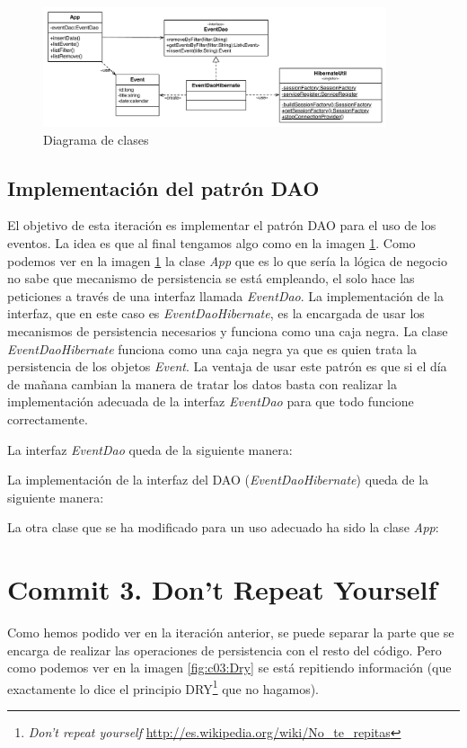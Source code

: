\documentclass{article}
\begin{document}
\begin{figure}[h]
  \centering
    \includegraphics[width=0.9\textwidth]{commit02/img/UmlClass.pdf}
  \caption{Diagrama de clases}
  \label{fig:c02:UmlClass}
\end{figure}	

\subsection{Implementación del patrón DAO}
	El objetivo de esta iteración es implementar el patrón DAO para el uso de los eventos. La idea es que al final tengamos algo como en la imagen \ref{fig:c02:UmlClass}. Como podemos ver en la imagen \ref{fig:c02:UmlClass} la clase \emph{App} que es lo que sería la lógica de negocio no sabe que mecanismo de persistencia se está empleando, el solo hace las peticiones a través de una interfaz llamada \emph{EventDao}. La implementación de la interfaz, que en este caso es \emph{EventDaoHibernate}, es la encargada de usar los mecanismos de persistencia necesarios y funciona como una caja negra. La clase \emph{EventDaoHibernate} funciona como una caja negra ya que es quien trata la persistencia de los objetos \emph{Event}. La ventaja de usar este patrón es que si el día de mañana cambian la manera de tratar los datos basta con realizar la implementación adecuada de la interfaz \emph{EventDao} para que todo funcione correctamente.
	
	La interfaz \emph{EventDao} queda de la siguiente manera:


	La implementación de la interfaz del DAO (\emph{EventDaoHibernate}) queda de la siguiente manera:


	La otra clase que se ha modificado para un uso adecuado ha sido la clase \emph{App}:


\section{Commit 3. Don't Repeat Yourself}
	Como hemos podido ver en la iteración anterior, se puede separar la parte que se encarga de realizar las operaciones de persistencia con el resto del código. Pero como podemos ver en la imagen \ref{fig:c03:Dry} se está repitiendo información (que exactamente lo dice el principio DRY\footnote{ \textit{Don't repeat yourself} \url{http://es.wikipedia.org/wiki/No_te_repitas}} que no hagamos).
\end{document}
